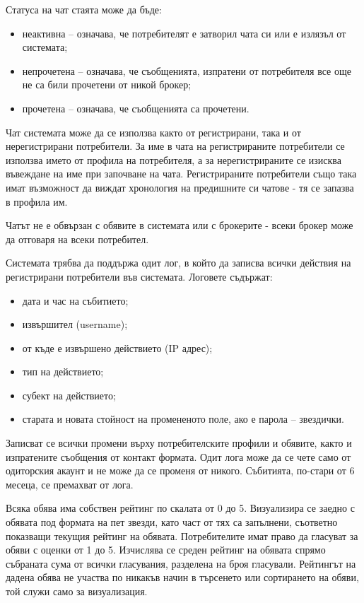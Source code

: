 \documentclass[]{article}
\begin{document}
\begin{enumerate}[I.]
{Статуса на чат стаята може да бъде:
\begin{itemize}
\item неактивна -- означава, че потребителят е затворил чата си или е излязъл от системата;
\item непрочетена -- означава, че съобщенията, изпратени от потребителя все още не са били прочетени от никой брокер;
\item прочетена -- означава, че съобщенията са прочетени.
\end{itemize}

Чат системата може да се използва както от регистрирани, така и от нерегистрирани потребители. За име в чата на регистрираните потребители се използва името от профила на потребителя, а за нерегистрираните се изисква въвеждане на име при започване на чата. Регистрираните потребители също така имат възможност да виждат хронология на предишните си чатове - тя се запазва в профила им.

Чатът не е обвързан с обявите в системата или с брокерите - всеки брокер може да отговаря на всеки потребител.


Системата трябва да поддържа одит лог, в който да записва всички действия на регистрирани потребители във системата. Логовете съдържат:
	\begin{itemize}
	\item дата и час на събитието;
	\item извършител (username);
	\item от къде е извършено действието (IP адрес);
	\item тип на действието;
	\item субект на действието;
	\item старата и новата стойност на промененото поле, ако е парола -- звездички.
	\end{itemize}
Записват се всички промени върху потребителските профили и обявите, както и изпратените съобщения от контакт формата.
Одит лога може да се чете само от одиторския акаунт и не може да се променя от никого. Събитията, по-стари от 6 месеца, се премахват от лога.


Всяка обява има собствен рейтинг по скалата от 0 до 5. Визуализира се заедно с обявата под формата на пет звезди, като част от тях са запълнени, съответно показващи текущия рейтинг на обявата. Потребителите имат право да гласуват за обяви с оценки от 1 до 5. Изчислява се среден рейтинг на обявата спрямо събраната сума от всички гласувания, разделена на броя гласували. Рейтингът на дадена обява не участва по никакъв начин в търсенето или сортирането на обяви, той служи само за визуализация. 

}
\end{enumerate}
\end{document}
